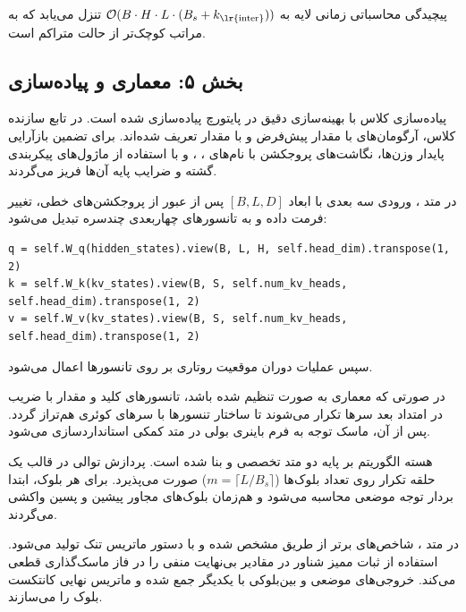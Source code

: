پیچیدگی محاسباتی زمانی لایه به $\mathcal{O}(B \cdot H \cdot L \cdot (B_s + k_{\text{\lr{inter}}}))$ تنزل می‌یابد که به مراتب کوچک‌تر از حالت متراکم است.

\subsection*{بخش ۵: معماری و پیاده‌سازی }
پیاده‌سازی کلاس  با بهینه‌سازی دقیق در پایتورچ پیاده‌سازی شده است. در تابع سازنده کلاس، آرگومان‌های  با مقدار پیش‌فرض  و  با مقدار  تعریف شده‌اند. برای تضمین بازآرایی پایدار وزن‌ها، نگاشت‌های پروجکشن با نام‌های ، ،  و  با استفاده از ماژول‌های  پیکربندی گشته و ضرایب پایه آن‌ها فریز می‌گردند.

در متد ، ورودی سه بعدی با ابعاد $[B, L, D]$ پس از عبور از پروجکشن‌های خطی، تغییر فرمت داده و به تانسورهای چهاربعدی چندسره تبدیل می‌شود:
\begin{latin}
\begin{verbatim}
q = self.W_q(hidden_states).view(B, L, H, self.head_dim).transpose(1, 2)
k = self.W_k(kv_states).view(B, S, self.num_kv_heads, self.head_dim).transpose(1, 2)
v = self.W_v(kv_states).view(B, S, self.num_kv_heads, self.head_dim).transpose(1, 2)
\end{verbatim}
\end{latin}
سپس عملیات دوران موقعیت روتاری  بر روی تانسورها اعمال می‌شود.

در صورتی که معماری به صورت  تنظیم شده باشد، تانسورهای کلید و مقدار با ضریب  در امتداد بعد سرها تکرار می‌شوند تا ساختار تنسورها با سرهای کوئری هم‌تراز گردد. پس از آن، ماسک توجه به فرم باینری بولی  در متد کمکی  استانداردسازی می‌شود.

هسته الگوریتم بر پایه دو متد تخصصی  و  بنا شده است. پردازش توالی در قالب یک حلقه تکرار روی تعداد بلوک‌ها ($m = \lceil L / B_s \rceil$) صورت می‌پذیرد. برای هر بلوک، ابتدا بردار توجه موضعی محاسبه می‌شود و هم‌زمان بلوک‌های مجاور پیشین و پسین واکشی می‌گردند.

در متد ، شاخص‌های برتر از طریق  مشخص شده و با دستور  ماتریس تنک تولید می‌شود. استفاده از  ثبات ممیز شناور در مقادیر بی‌نهایت منفی را در فاز ماسک‌گذاری قطعی می‌کند. خروجی‌های موضعی و بین‌بلوکی با یکدیگر جمع شده و ماتریس نهایی کانتکست بلوک را می‌سازند.

